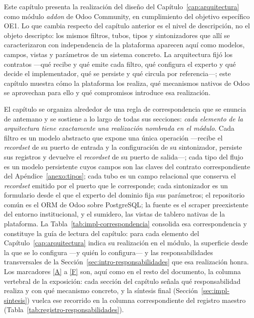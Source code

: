 \documentclass[12pt]{report}
\DeclareRobustCommand{\resp}[1]{\hyperref[tab:registro-responsabilidades]{\textcolor{respcolor}{[#1]}}}
\begin{document}
Este capítulo presenta la realización del diseño del Capítulo~\ref{cap:arquitectura} como módulo \textit{addon} de Odoo Community, en cumplimiento del objetivo específico OE1. Lo que cambia respecto del capítulo anterior es el nivel de descripción, no el objeto descripto: los mismos filtros, tubos, tipos y sintonizadores que allí se caracterizaron con independencia de la plataforma aparecen aquí como modelos, campos, vistas y parámetros de un sistema concreto. La arquitectura fijó los contratos ---qué recibe y qué emite cada filtro, qué configura el experto y qué decide el implementador, qué se persiste y qué circula por referencia---; este capítulo muestra cómo la plataforma los realiza, qué mecanismos nativos de Odoo se aprovechan para ello y qué compromisos introduce esa realización.

El capítulo se organiza alrededor de una regla de correspondencia que se enuncia de antemano y se sostiene a lo largo de todas sus secciones: \textit{cada elemento de la arquitectura tiene exactamente una realización nombrada en el módulo}. Cada filtro es un modelo abstracto que expone una única operación ---recibe el \textit{recordset} de su puerto de entrada y la configuración de su sintonizador, persiste sus registros y devuelve el \textit{recordset} de su puerto de salida---; cada tipo del flujo es un modelo persistente cuyos campos son las claves del contrato correspondiente del Apéndice~\ref{anexo:tipos}; cada tubo es un campo relacional que conserva el \textit{recordset} emitido por el puerto que le corresponde; cada sintonizador es un formulario desde el que el experto del dominio fija sus parámetros; el repositorio común es el ORM de Odoo sobre PostgreSQL; la fuente es el scraper preexistente del entorno institucional, y el sumidero, las vistas de tablero nativas de la plataforma. La Tabla~\ref{tab:impl-correspondencia} consolida esa correspondencia y constituye la guía de lectura del capítulo: para cada elemento del Capítulo~\ref{cap:arquitectura} indica su realización en el módulo, la superficie desde la que se lo configura ---y quién lo configura--- y las responsabilidades transversales de la Sección~\ref{sec:intro-responsabilidades} que esa realización honra. Los marcadores \resp{A} a \resp{F} son, aquí como en el resto del documento, la columna vertebral de la exposición: cada sección del capítulo señala qué responsabilidad realiza y con qué mecanismo concreto, y la síntesis final (Sección~\ref{sec:impl-sintesis}) vuelca ese recorrido en la columna correspondiente del registro maestro (Tabla~\ref{tab:registro-responsabilidades}).
\end{document}
